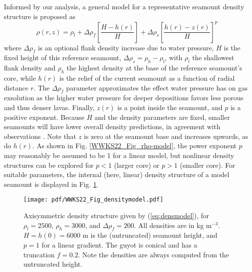 Informed by our analysis, a general model for a representative seamount density structure is proposed as
\begin{equation}
\rho(r,z) = \rho_l + \Delta \rho_f \left [\frac{H-h(r)}{H}\right ] + \Delta \rho_s \left [ \frac{h(r)-z(r)}{H} \right ]^p
\label{eq:densmodel}
\end{equation}
where $\Delta \rho_f$ is an optional flank density increase due to water pressure, $H$ is the fixed height
of this reference seamount, $\Delta \rho_s = \rho_h - \rho_l$, with $\rho_l$ the shallowest flank density and
$\rho_h$ the highest density at the base of the reference seamount's core, while $h(r)$ is the relief of
the current seamount as a function of radial distance $r$. The $\Delta \rho_f$ parameter approximates the effect
water pressure has on gas exsolution as the higher water pressure for deeper depositions favors less
porous and thus denser lavas.  Finally, $z(r)$ is a point inside the seamount, and $p$ is a
positive exponent.  Because $H$ and the density parameters are fixed, smaller seamounts will have lower overall
density predictions, in agreement with observations \citep{H1991}. Note that $z$ is zero at the seamount base and increases
upwards, as do $h(r)$. As shown in Fig. \ref{WWKS22_Fig_rho-model},
the power exponent $p$ may reasonably be assumed to be 1 for a linear model, but nonlinear density structures
can be explored for $p < 1$ (larger core) or $p > 1$ (smaller core). For suitable parameters, the internal (here, linear)
density structure of a model seamount is displayed in Fig. \ref{WWKS22_Fig_densitymodel}.

\begin{figure}
\centering
\texttt{[image: pdf/WWKS22\_Fig\_densitymodel.pdf]}
\caption{Axisymmetric density structure given by (\ref{eq:densmodel}), for $\rho_l = 2500$, $\rho_h = 3000$,
and $\Delta \rho_f = 200$. All densities are in kg m$^{-3}$. $H = h(0) = 6000$ m is the (untruncated) seamount height,
and $p = 1$ for a linear gradient. The guyot is conical and has a truncation $f = 0.2$.  Note the densities are
always computed from the untruncated height.}
\label{WWKS22_Fig_densitymodel}
\end{figure}

